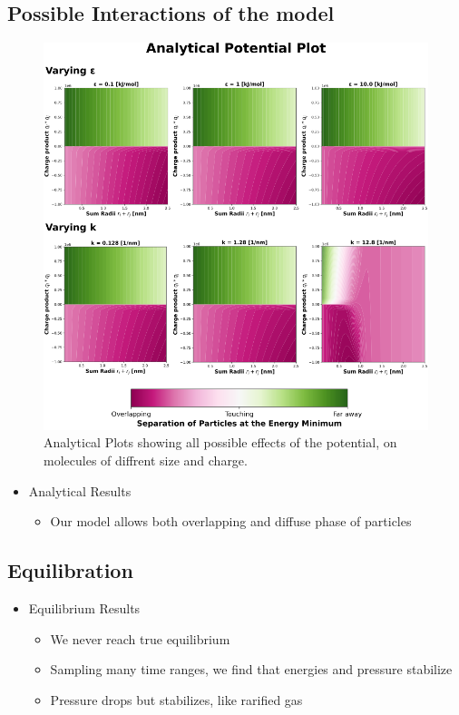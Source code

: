 \documentclass[a4paper,11pt,oneside]{book}
\begin{document}
\subsection{Possible Interactions of the model}

\begin{figure}[!htbp]
\centering
\includegraphics[width=0.7\linewidth]{files/Fig2-4a634fb40ba25fe916b6010c8907b16e.png}
\caption[]{Analytical Plots showing all possible effects of the potential, on molecules of diffrent size and charge.}
\label{Fig2_PotentialPlot}
\end{figure}

\begin{itemize}
\item Analytical Results\begin{itemize}
\item Our model allows both overlapping and diffuse phase of particles
\end{itemize}
\end{itemize}

\subsection{Equilibration}

\begin{itemize}
\item Equilibrium Results\begin{itemize}
\item We never reach true equilibrium
\item Sampling many time ranges, we find that energies and pressure stabilize
\item Pressure drops but stabilizes, like rarified gas
\end{itemize}
\end{itemize}
\end{document}
